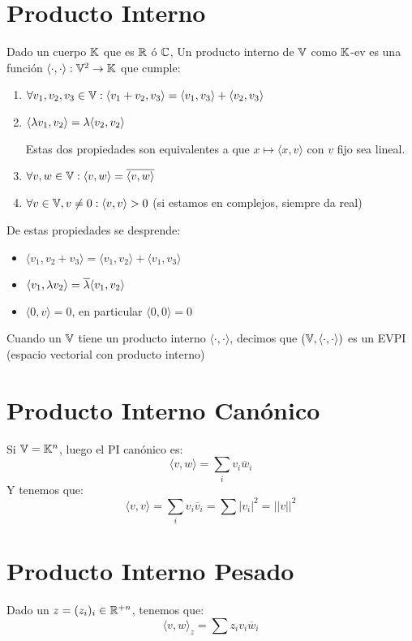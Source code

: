 \documentclass{article}
\begin{document}
\section*{Producto Interno}
Dado un cuerpo $\mathbb{K}$ que es $\mathbb{R}$ ó $\mathbb{C}$,
Un producto interno de $\mathbb{V}$ como $\mathbb{K}$-ev es una función $\langle \cdot , \cdot \rangle : \mathbb{V}^2 \to \mathbb{K}$ que cumple:
\begin{enumerate}
	\item $\forall v_1, v_2, v_3 \in \mathbb{V} : \langle v_1 + v_2, v_3 \rangle = \langle v_1, v_3 \rangle + \langle v_2, v_3\rangle$
	\item $\langle \lambda v_1, v_2 \rangle = \lambda \langle v_2, v_2 \rangle$

	Estas dos propiedades son equivalentes a que $x \mapsto \langle x, v \rangle$ con $v$ fijo sea lineal.
	\item $\forall v, w \in \mathbb{V}: \langle v, w \rangle = \overline {\langle v, w \rangle}$
	\item $\forall v \in \mathbb{V}, v \neq 0 : \langle v, v \rangle > 0$ (si estamos en complejos, siempre da real)
\end{enumerate}

De estas propiedades se desprende:
\begin{itemize}
\item $\langle v_1, v_2 + v_3 \rangle = \langle v_1, v_2 \rangle + \langle v_1, v_3 \rangle$
\item $\langle v_1, \lambda v_2 \rangle = \overline {\lambda} \langle v_1, v_2 \rangle$
\item $\langle 0, v \rangle = 0$, en particular $\langle 0, 0 \rangle = 0$
\end{itemize}

Cuando un $\mathbb{V}$ tiene un producto interno $\langle \cdot , \cdot \rangle$, decimos que $(\mathbb{V}, \langle \cdot , \cdot \rangle)$ es un EVPI (espacio vectorial con producto interno)

\section*{Producto Interno Canónico}
Si $\mathbb{V} = \mathbb{K}^n$, luego el PI canónico es:
\[
	\langle v, w \rangle = \sum_i v_i \overline w_i
\]
Y tenemos que:
\[
	\langle v, v \rangle = \sum_i v_i \overline v_i = \sum |v_i|^2 = ||v||^2
\]

\section*{Producto Interno Pesado}
Dado un $z = (z_i)_i \in \mathbb{R}^{+n}$, tenemos que:
\[
	\langle v, w \rangle_z = \sum z_iv_i\overline w_i
\]
\end{document}
